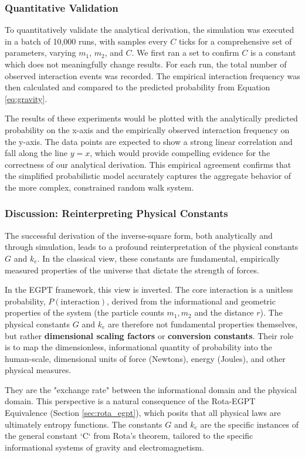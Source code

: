 \documentclass[11pt, letterpaper]{article}
\begin{document}
\subsubsection{Quantitative Validation}
To quantitatively validate the analytical derivation, the simulation was executed in a batch of 10,000 runs, with samples every $C$ ticks for a comprehensive set of parameters, varying $m_1$, $m_2$, and $C$. We first ran a set to confirm $C$ is a constant which does not meaningfully change results. For each run, the total number of observed interaction events was recorded. The empirical interaction frequency was then calculated and compared to the predicted probability from Equation \ref{eq:gravity}.

The results of these experiments would be plotted with the analytically predicted probability on the x-axis and the empirically observed interaction frequency on the y-axis. The data points are expected to show a strong linear correlation and fall along the line $y=x$, which would provide compelling evidence for the correctness of our analytical derivation. This empirical agreement confirms that the simplified probabilistic model accurately captures the aggregate behavior of the more complex, constrained random walk system.

\subsubsection{Discussion: Reinterpreting Physical Constants}
The successful derivation of the inverse-square form, both analytically and through simulation, leads to a profound reinterpretation of the physical constants $G$ and $k_e$. In the classical view, these constants are fundamental, empirically measured properties of the universe that dictate the strength of forces.

In the EGPT framework, this view is inverted. The core interaction is a unitless probability, $P(\text{interaction})$, derived from the informational and geometric properties of the system (the particle counts $m_1, m_2$ and the distance $r$). The physical constants $G$ and $k_e$ are therefore not fundamental properties themselves, but rather \textbf{dimensional scaling factors} or \textbf{conversion constants}. Their role is to map the dimensionless, informational quantity of probability into the human-scale, dimensional units of force (Newtons), energy (Joules), and other physical measures.

They are the "exchange rate" between the informational domain and the physical domain. This perspective is a natural consequence of the Rota-EGPT Equivalence (Section \ref{sec:rota_egpt}), which posits that all physical laws are ultimately entropy functions. The constants $G$ and $k_e$ are the specific instances of the general constant `C` from Rota's theorem, tailored to the specific informational systems of gravity and electromagnetism.
\end{document}
